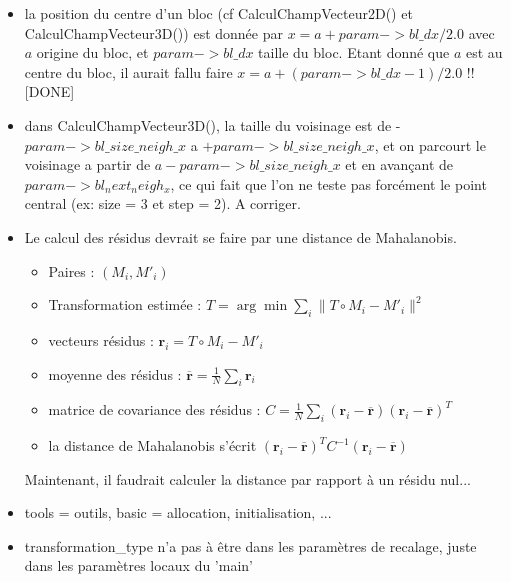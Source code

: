 \begin{itemize}

\item  la position du centre d'un bloc (cf CalculChampVecteur2D() et CalculChampVecteur3D()) est donn\'ee par 
$x = a + param->bl\_dx / 2.0$ avec $a$ origine du bloc, et $param->bl\_dx$ taille du bloc. Etant donn\'e que $a$ est au centre du bloc, il aurait fallu faire 
$x = a + (param->bl\_dx -1)/ 2.0$ !! [DONE]

\item dans CalculChampVecteur3D(), la taille du voisinage est de -$param->bl\_size\_neigh\_x$ a $+param->bl\_size\_neigh\_x$, et on parcourt le voisinage a partir de $a - param->bl\_size\_neigh\_x$ et en avan\c{c}ant de $param->bl_next_neigh_x$, ce qui fait que l'on ne teste pas forc\'ement le point central (ex: size = 3 et step = 2). A corriger.

\item Le calcul des r\'esidus devrait se faire par une distance de Mahalanobis. 
\begin{itemize}
\item Paires : $(M_i, M'_i)$
\item Transformation estim\'ee : $T = \arg \min \sum_i \| T \circ M_i - M'_i \|^2$
\item vecteurs r\'esidus : $\mathbf{r}_i = T \circ M_i - M'_i$
\item moyenne des r\'esidus : 
$\overline{\mathbf{r}} = \frac{1}{N} \sum_i \mathbf{r}_i$
\item matrice de covariance des r\'esidus : 
$C = \frac{1}{N} \sum_i (\mathbf{r}_i - \overline{\mathbf{r}}) (\mathbf{r}_i- \overline{\mathbf{r}})^T$
\item la distance de Mahalanobis s'\'ecrit 
$(\mathbf{r}_i- \overline{\mathbf{r}})^T C^{-1} (\mathbf{r}_i- \overline{\mathbf{r}})$

\end{itemize}
Maintenant, il faudrait calculer la distance par rapport \`a un r\'esidu nul...





\item tools = outils, basic = allocation, initialisation, ...

\item transformation\_type n'a pas \`a \^etre dans les param\`etres de recalage, juste dans les param\`etres locaux du 'main'

\end{itemize}

